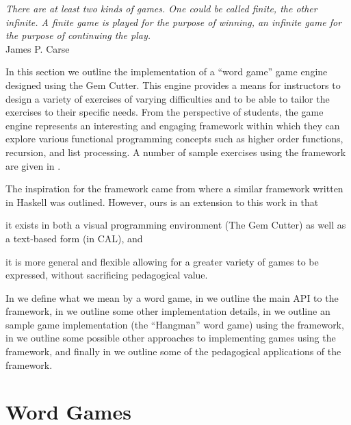 \label{chapter:eval}

\begin{flushright}
\textit{There are at least two kinds of games.  One could be called finite, the other infinite. A finite game is played for the purpose of winning, an infinite game for the purpose of continuing the play.}
\\
James P. Carse \cite{Carse87} \\
\end{flushright}

In this section we outline the implementation of a ``word game'' game engine designed using the Gem Cutter.  This engine provides a means for instructors to design a variety of exercises of varying difficulties and to be able to tailor the exercises to their specific needs.  From the perspective of students, the game engine represents an interesting and engaging framework within which they can explore various functional programming concepts such as higher order functions, recursion, and list processing.  A number of sample exercises using the framework are given in .

The inspiration for the framework came from \cite{Curtis05} where a similar framework written in Haskell was outlined.  However, ours is an extension to this work in that \begin{inparaenum}\item it exists in both a visual programming environment (The Gem Cutter) as well as a text-based form (in CAL), and \item it is more general and flexible allowing for a greater variety of games to be expressed, without sacrificing pedagogical value.\end{inparaenum}

In  we define what we mean by a word game, in  we outline the main API to the framework, in  we outline some other implementation details, in  we outline an sample game implementation (the ``Hangman'' word game) using the framework, in  we outline some possible other approaches to implementing games using the framework, and finally in  we outline some of the pedagogical applications of the framework.

\section{Word Games}
\label{wordGameDefn}

